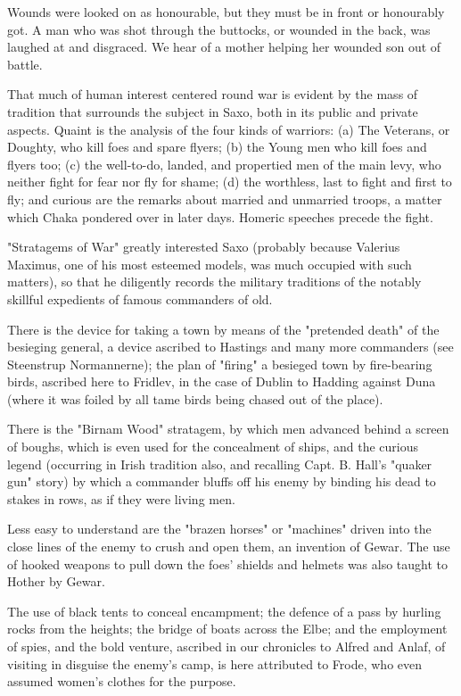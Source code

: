 \documentclass[10pt,a4paper]{report}
\begin{document}
Wounds were looked on as honourable, but they must be in front or honourably got. A man who was shot through the buttocks, or wounded in the back, was laughed at and disgraced. We hear of a mother helping her wounded son out of battle.

That much of human interest centered round war is evident by the mass of tradition that surrounds the subject in Saxo, both in its public and private aspects. Quaint is the analysis of the four kinds of warriors: (a) The Veterans, or Doughty, who kill foes and spare flyers; (b) the Young men who kill foes and flyers too; (c) the well-to-do, landed, and propertied men of the main levy, who neither fight for fear nor fly for shame; (d) the worthless, last to fight and first to fly; and curious are the remarks about married and unmarried troops, a matter which Chaka pondered over in later days. Homeric speeches precede the fight.

"Stratagems of War" greatly interested Saxo (probably because Valerius Maximus, one of his most esteemed models, was much occupied with such matters), so that he diligently records the military traditions of the notably skillful expedients of famous commanders of old.

There is the device for taking a town by means of the "pretended death" of the besieging general, a device ascribed to Hastings and many more commanders (see Steenstrup Normannerne); the plan of "firing" a besieged town by fire-bearing birds, ascribed here to Fridlev, in the case of Dublin to Hadding against Duna (where it was foiled by all tame birds being chased out of the place).

There is the "Birnam Wood" stratagem, by which men advanced behind a screen of boughs, which is even used for the concealment of ships, and the curious legend (occurring in Irish tradition also, and recalling Capt. B. Hall's "quaker gun" story) by which a commander bluffs off his enemy by binding his dead to stakes in rows, as if they were living men.

Less easy to understand are the "brazen horses" or "machines" driven into the close lines of the enemy to crush and open them, an invention of Gewar. The use of hooked weapons to pull down the foes' shields and helmets was also taught to Hother by Gewar.

The use of black tents to conceal encampment; the defence of a pass by hurling rocks from the heights; the bridge of boats across the Elbe; and the employment of spies, and the bold venture, ascribed in our chronicles to Alfred and Anlaf, of visiting in disguise the enemy's camp, is here attributed to Frode, who even assumed women's clothes for the purpose.
\end{document}
